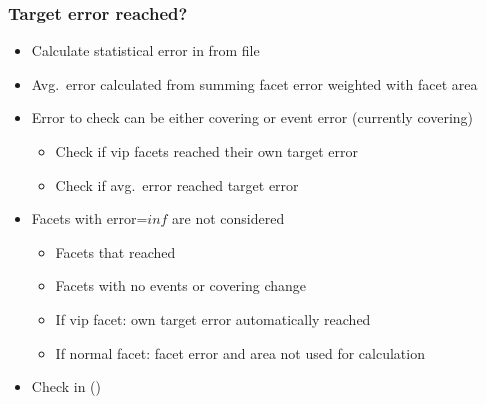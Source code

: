 \subsubsection{Target error reached?}
\begin{itemize}[noitemsep,topsep=0pt, partopsep=0pt]
\item Calculate statistical error in  from  file
\item Avg.\ error calculated from summing facet error weighted with facet area
\item Error to check can be either covering or event error (currently covering)
\begin{itemize}[noitemsep,topsep=0pt, partopsep=0pt]
\item Check if vip facets reached their own target error
\item Check if avg.\ error reached target error
\end{itemize}
\item Facets with error=$inf$ are not considered
\begin{itemize}[noitemsep,topsep=0pt, partopsep=0pt]
\item Facets that reached 
\item Facets with no events or covering change
\item If vip facet: own target error automatically reached
\item If normal facet: facet error and area not used for calculation
\end{itemize}
\item Check in  ()
\end{itemize}

